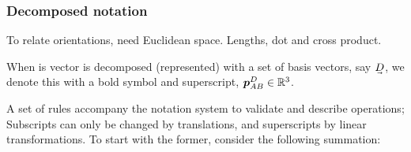 %

% 

%
%
%
%

\subsubsection{Decomposed notation}\label{IV_sec:decomposed_notation}


To relate orientations, need Euclidean space. Lengths, dot and cross product.

When is vector is decomposed (represented) with a set of basis vectors, say $\uvec{D}$, we denote this with a bold symbol and superscript, $\boldsymbol{p}_{AB}^D\in\mathbb{R}^3$.


A set of rules accompany the notation system to validate and describe operations; Subscripts can only be changed by translations, and superscripts by linear transformations. To start with the former, consider the following summation:
%

